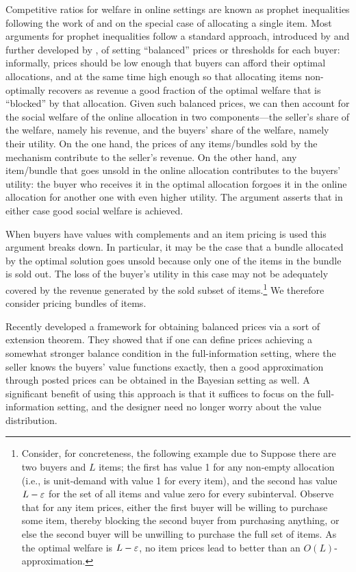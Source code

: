 Competitive ratios for welfare in online settings are known as prophet
inequalities following the work of \citet{KS-78} and \citet{Cahn84} on
the special case of allocating a single item. Most arguments for
prophet inequalities follow a standard approach, introduced by
\citet{KW12} and further developed by \citet{FGL15}, of setting
``balanced'' prices or thresholds for each buyer: informally, prices
should be low enough that buyers can afford their optimal allocations,
and at the same time high enough so that allocating items
non-optimally recovers as revenue a good fraction of the optimal
welfare that is ``blocked'' by that allocation. Given such balanced
prices, we can then account for the social welfare of the online
allocation in two components---the seller's share of the welfare,
namely his revenue, and the buyers' share of the welfare, namely their
utility. On the one hand, the prices of any items/bundles sold by the
mechanism contribute to the seller's revenue. On the other hand, any
item/bundle that goes unsold in the online allocation contributes to
the buyers' utility: the buyer who receives it in the optimal
allocation forgoes it in the online allocation for another one with
even higher utility. The argument asserts that in either case good
social welfare is achieved.

When buyers have values with complements and an item pricing is used
this argument breaks down. In particular, it may be the case that a
bundle allocated by the optimal solution goes unsold because only one
of the items in the bundle is sold out.  The loss of the buyer's
utility in this case may not be adequately covered by the revenue
generated by the sold subset of items.\footnote{\label{note:item-pricing-L} Consider, for
  concreteness, the following example due to \citeauthor{FGL15}
  Suppose there are two buyers and $L$ items; the first has value 1
  for any non-empty allocation (i.e., is unit-demand with value 1 for
  every item), and the second has value $L - \varepsilon$ for the set of all
  items and value zero for every subinterval. Observe that for any
  item prices, either the first buyer will be willing to purchase some
  item, thereby blocking the second buyer from purchasing anything, or
  else the second buyer will be unwilling to purchase the full set of
  items. As the optimal welfare is $L-\varepsilon$, no item prices lead to
  better than an $O(L)$-approximation.} We therefore consider pricing
bundles of items.

Recently \citet{DFKL-17} developed a framework for obtaining balanced
prices via a sort of extension theorem. They showed that if one can
define prices achieving a somewhat stronger balance condition in the
full-information setting, where the seller knows the buyers' value
functions exactly, then a good approximation through posted prices can
be obtained in the Bayesian setting as well. A significant benefit of
using this approach is that it suffices to focus on the
full-information setting, and the designer need no longer worry about
the value distribution.

